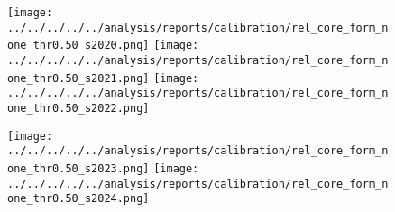 \begin{figure}[t]
  \texttt{[image: ../../../../../analysis/reports/calibration/rel\_core\_form\_none\_thr0.50\_s2020.png]}
  \texttt{[image: ../../../../../analysis/reports/calibration/rel\_core\_form\_none\_thr0.50\_s2021.png]}
  \texttt{[image: ../../../../../analysis/reports/calibration/rel\_core\_form\_none\_thr0.50\_s2022.png]}
  \par\vspace{2pt}
  \texttt{[image: ../../../../../analysis/reports/calibration/rel\_core\_form\_none\_thr0.50\_s2023.png]}
  \texttt{[image: ../../../../../analysis/reports/calibration/rel\_core\_form\_none\_thr0.50\_s2024.png]}
\end{figure}
